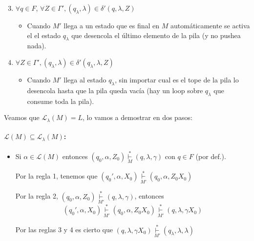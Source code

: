 \begin{demoPart}[0.8\textwidth]
  \begin{itemize}
    \begin{enumerate}
      \setcounter{enumi}{2}
      \item \(\forall q\in F\), \(\forall Z\in\Gamma', (q_\lambda, \lambda) \in\delta'(q, \lambda, Z)\)
            \begin{itemize}
              \item[] Cuando \(M'\) llega a un estado que es final en \(M\) automáticamente se activa el el estado \(q_\lambda\) que desencola el último elemento de la pila (y no pushea nada).
            \end{itemize}
      \item \(\forall Z\in\Gamma', (q_\lambda, \lambda) \in\delta'(q_\lambda, \lambda, Z)\)
            \begin{itemize}
              \item[] Cuando \(M'\) llega al estado \(q_\lambda\), sin importar cual es el tope de la pila lo desencola hasta que la pila queda vacía (hay un loop sobre \(q_\lambda\) que consume toda la pila).
            \end{itemize}
    \end{enumerate}
  \end{itemize}

  Veamos que \(\mathcal{L}_\lambda(M) = L\), lo vamos a demostrar en dos pasos:
  \paragraph{\(\mathcal{L}(M) \subseteq \mathcal{L}_\lambda(M)\):}
  \begin{itemize}
    \item[]   Si \(\alpha\in \mathcal{L}(M)\) entonces \((q_0, \alpha, Z_0) \underset{M}{\overset{*}{\vdash}}  (q, \lambda, \gamma)\) con \(q\in F\) (por def.).

      Por la regla 1, tenemos que \((q_0', \alpha, X_0) \underset{M'}{\overset{*}{\vdash}}  (q_0, \alpha, Z_0X_0)\)

      Por la regla 2, \((q_0, \alpha, Z_0) \underset{M'}{\overset{*}{\vdash}}  (q, \lambda, \gamma)\), entonces \[(q_0', \alpha, X_0) \underset{M'}{\overset{*}{\vdash}}  (q_0, \alpha, Z_0X_0) \underset{M'}{\overset{*}{\vdash}} (q,\lambda, \gamma X_0)\]

      Por las reglas 3 y 4 es cierto que \((q,\lambda, \gamma X_0) \underset{M'}{\overset{*}{\vdash}} (q_\lambda, \lambda, \lambda)\)


\end{itemize}
\end{demoPart}

